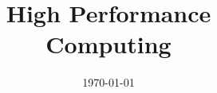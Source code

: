 \documentclass[a4paper,12pt]{report}
\institute{UniTs - University of Trieste}
\title{High Performance\\ Computing}
\date{\today}
\begin{document}
\maketitle



\toc




\end{document}

